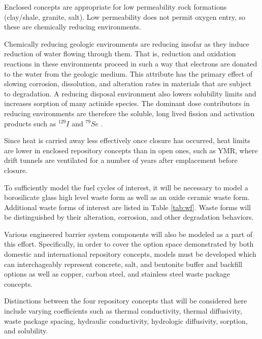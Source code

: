 Enclosed concepts are appropriate for low permeability rock formations (clay/shale, 
granite, salt).  Low permeability does not permit oxygen entry, so these are
chemically reducing environments.  

Chemically reducing geologic environments are reducing insofar as they induce 
reduction of water flowing through them. That is, reduction and oxidation 
reactions in these environments proceed in such a way that electrons are 
donated to the water from the geologic medium. This attribute has the primary 
effect of slowing corrosion, dissolution, and  alteration rates in materials 
that are subject to degradation. A reducing disposal environment also lowers 
solubility limits and increases sorption of many actinide species. The dominant 
dose contributors in reducing environments are therefore the soluble, long 
lived fission and activation products such as $^{129}I$ and $^{79}Se$ 
\cite{oecd-nea_advanced_2006, von_lensa_red-impact_2008}.  

Since heat is carried away less effectively once closure 
has occurred, heat limits are lower in enclosed repository concepts than in open 
ones, such as \gls{YMR}, where drift tunnels are ventilated for a number of years
after emplacement before closure.

To sufficiently model the fuel cycles of interest, it will be necessary to model 
a borosilicate glass high level waste form as well as an oxide ceramic waste 
form. Additional waste forms 
of interest are listed in Table \ref{tab:wf}. Waste forms will be 
distinguished by their alteration, corrosion, and other degradation behaviors.

Various engineered barrier system components will also be modeled as a part of 
this effort.  Specifically, in order to cover the option space demonstrated by 
both domestic and international repository concepts, models must be developed 
which can interchageably represent concrete, salt, and bentonite buffer and 
backfill options as well as copper, carbon steel, and stainless steel waste 
package concepts.  

Distinctions between the four repository concepts that will be considered here 
include varying coefficients such as thermal conductivity, thermal diffusivity, 
waste package spacing,  hydraulic conductivity,  hydrologic diffusivity, 
sorption, and solubility.

